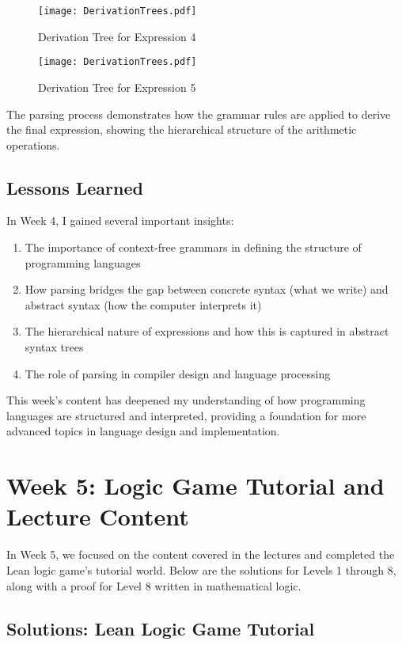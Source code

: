 \documentclass{article}
\begin{document}
\begin{figure}[h]
\centering
\texttt{[image: DerivationTrees.pdf]}
\caption{Derivation Tree for Expression 4}
\end{figure}

\begin{figure}[h]
\centering
\texttt{[image: DerivationTrees.pdf]}
\caption{Derivation Tree for Expression 5}
\end{figure}

The parsing process demonstrates how the grammar rules are applied to derive the final expression, showing the hierarchical structure of the arithmetic operations.

\subsection*{Lessons Learned}

In Week 4, I gained several important insights:

\begin{enumerate}
    \item The importance of context-free grammars in defining the structure of programming languages
    \item How parsing bridges the gap between concrete syntax (what we write) and abstract syntax (how the computer interprets it)
    \item The hierarchical nature of expressions and how this is captured in abstract syntax trees
    \item The role of parsing in compiler design and language processing
\end{enumerate}

This week's content has deepened my understanding of how programming languages are structured and interpreted, providing a foundation for more advanced topics in language design and implementation.

\section{Week 5: Logic Game Tutorial and Lecture Content}
\label{sec:week5}

In Week 5, we focused on the content covered in the lectures and completed the Lean logic game's tutorial world. Below are the solutions for Levels 1 through 8, along with a proof for Level 8 written in mathematical logic.

\subsection*{Solutions: Lean Logic Game Tutorial}
\end{document}
